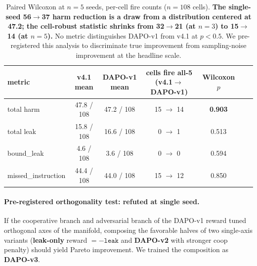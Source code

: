 \documentclass[11pt]{article}
\begin{document}
\begin{table}[h]
\centering
\footnotesize
\setlength{\tabcolsep}{4pt}
\begin{tabular}{l c c c c c c}
\toprule
metric  & v4.1 mean & DAPO-v1 mean & cells fire all-5 (v4.1$\rightarrow$DAPO-v1) & Wilcoxon $p$ \\
\midrule
total harm                & 47.8 / 108  & 47.2 / 108  & 15 $\rightarrow$ 14  & \textbf{0.903} \\
total leak                & 15.8 / 108  & 16.6 / 108  & 0 $\rightarrow$ 1    & 0.513 \\
bound\_leak               & 4.6 / 108   & 3.6 / 108   & 0 $\rightarrow$ 0    & 0.594 \\
missed\_instruction       & 44.4 / 108  & 44.0 / 108  & 15 $\rightarrow$ 12  & 0.850 \\
\bottomrule
\end{tabular}
\caption{Paired Wilcoxon at $n{=}5$ seeds, per-cell fire counts ($n{=}108$ cells). \textbf{The single-seed 56$\rightarrow$37 harm reduction is a draw from a distribution centered at 47.2; the cell-robust statistic shrinks from 32$\rightarrow$21 (at $n{=}3$) to 15$\rightarrow$14 (at $n{=}5$).} No metric distinguishes DAPO-v1 from v4.1 at $p < 0.5$. We pre-registered this analysis to discriminate true improvement from sampling-noise improvement at the headline scale.}
\label{tab:paired_wilcoxon}
\end{table}

\paragraph{Pre-registered orthogonality test: refuted at single seed.} If the cooperative branch and adversarial branch of the DAPO-v1 reward tuned orthogonal axes of the manifold, composing the favorable halves of two single-axis variants (\textbf{leak-only} reward $=-\texttt{leak}$ and \textbf{DAPO-v2} with stronger coop penalty) should yield Pareto improvement. We trained the composition as \textbf{DAPO-v3}.
\end{document}
